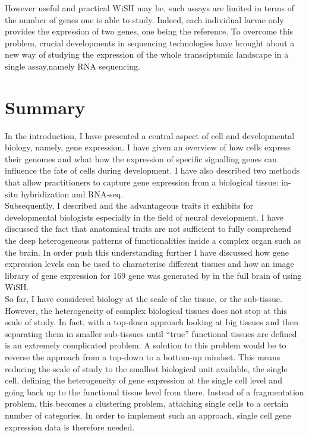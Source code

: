 	However useful and practical WiSH may be, such assays are limited in terms of the number of genes one is able to study. Indeed, each individual larvae only provides the expression of two genes, one being the reference. To overcome this problem, crucial developments in sequencing technologies have brought about a new way of studying the expression of the whole transciptomic landscape in a single assay,namely RNA sequencing.


    
\section{Summary}
     
     

	In the introduction, I have presented a central aspect of cell and developmental biology, namely, gene expression. I have given an overview of how cells express their genomes and what how the expression of specific signalling genes can influence the fate of cells during development. I have also described two methods that allow practitioners to capture gene expression from a biological tissue: in-situ hybridization and RNA-seq.\\
	
	Subsequently, I described \platyfull{} and the advantageous traits it exhibits for developmental biologists especially in the field of neural development. I have discussed the fact that anatomical traits are not sufficient to fully comprehend the deep heterogeneous patterns of functionalities inside a complex organ such as the brain. In order push this understanding further I have discussed how gene expression levels can be used to characterise different tissues and how an image library of gene expression for 169 gene was generated by \cite{Tomer10} in the full brain of \platy{} using WiSH.\\
	
	So far, I have considered biology at the scale of the tissue, or the sub-tissue. However, the heterogeneity of complex biological tissues does not stop at this scale of study. In fact, with a top-down approach looking at big tissues and then separating them in smaller sub-tissues until ``true'' functional tissues are defined is an extremely complicated problem. A solution to this problem would be to reverse the approach from a top-down to a bottom-up mindset. This means reducing the scale of study to the smallest biological unit available, the single cell, defining the heterogeneity of gene expression at the single cell level and going back up to the functional tissue level from there. Instead of a fragmentation problem, this becomes a clustering problem, attaching single cells to a certain number of categories. In order to implement such an approach, single cell gene expression data is therefore needed.\\
	
